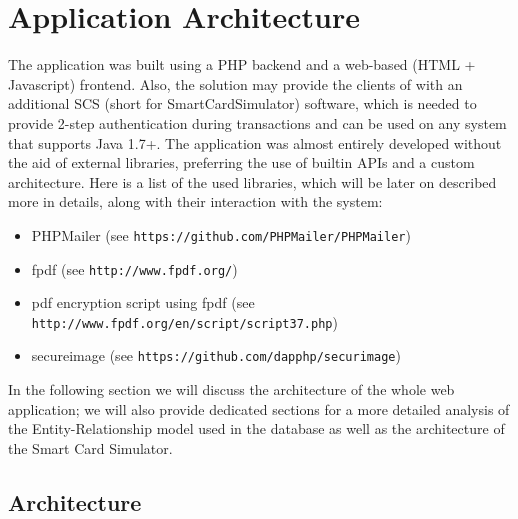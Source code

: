 \chapter{Application Architecture}\label{chapter:application_architecture}
The \gnb{} application was built using a PHP backend and a web-based (HTML + Javascript) frontend. Also, the solution may provide the clients of \gnb{} with an additional SCS (short for SmartCardSimulator) software, which is needed to provide 2-step authentication during transactions and can be used on any system that supports Java 1.7+.\newline
The application was almost entirely developed without the aid of external libraries, preferring the use of builtin APIs and a custom architecture. Here is a list of the used libraries, which will be later on described more in details, along with their interaction with the system:
\begin{itemize}
	\item PHPMailer (see \texttt{https://github.com/PHPMailer/PHPMailer})
	\item fpdf (see \texttt{http://www.fpdf.org/})
	\item pdf encryption script using fpdf (see \texttt{http://www.fpdf.org/en/script/script37.php})
	\item secureimage (see \texttt{https://github.com/dapphp/securimage})
\end{itemize}

In the following section we will discuss the architecture of the whole web application; we will also provide dedicated sections for a more detailed analysis of the Entity-Relationship model used in the database as well as the architecture of the Smart Card Simulator.
\section{Architecture}

